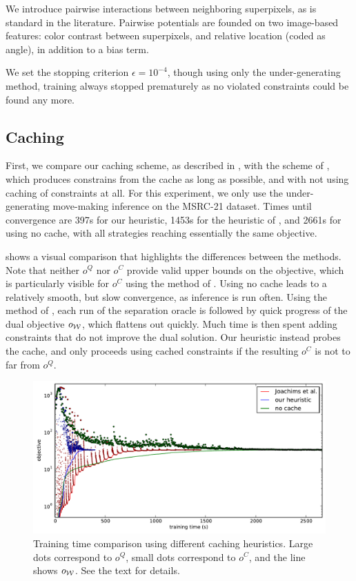 We introduce pairwise interactions between neighboring superpixels, as is
standard in the literature. Pairwise potentials are founded on two
image-based features: color contrast between superpixels, and relative location
(coded as angle), in addition to a bias term.

We set the stopping criterion $\epsilon=10^{-4}$, though using only
the under-generating method, training always stopped prematurely as no violated
constraints could be found any more.

\subsection{Caching}
First, we compare our caching scheme, as described in , with the
scheme of \citet{joachims2009cutting}, which produces constrains from the cache
as long as possible, and with not using caching of constraints at all.  For this experiment,
we only use the under-generating move-making inference on the MSRC-21 dataset. Times until convergence
are 397s for our heuristic, 1453s for the heuristic of
\citet{joachims2009cutting}, and 2661s for using no cache, with all strategies
reaching essentially the same objective.

 shows a visual comparison that highlights the differences
between the methods. Note that neither $o^Q$ nor $o^C$ provide valid upper bounds on the objective,
which is particularly visible for $o^C$ using the method of \cite{joachims2009cutting}.
Using no cache leads to a relatively smooth, but slow convergence, as inference is run often.
Using the method of \citet{joachims2009cutting}, each run of the separation oracle is followed by
quick progress of the dual objective $o_{\mathcal{W}}$, which flattens out quickly. Much time is then spent adding
constraints that do not improve the dual solution.
Our heuristic instead probes the cache, and only proceeds using cached constraints if the resulting
$o^C$ is not to far from $o^Q$.

\begin{figure}
\centering
\includegraphics[width=\linewidth]{caching}
\caption{%
Training time comparison using different caching heuristics.
Large dots correspond to $o^Q$, small dots correspond to $o^C$,
and the line shows $o_{\mathcal{W}}$. See the text for details.}
\end{figure}


